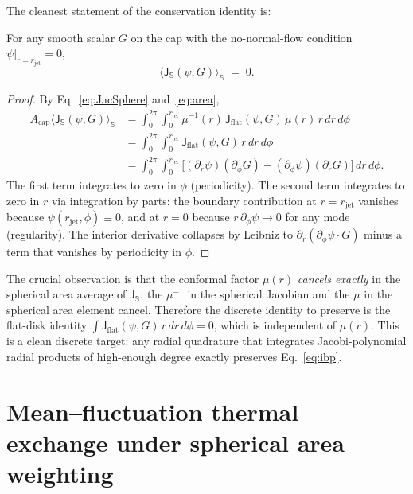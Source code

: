\documentclass[11pt]{article}
\newcommand{\Jflat}{\mathsf{J}_{\mathrm{flat}}}
\newcommand{\Jsphere}{\mathsf{J}_{\mathbb{S}}}
\newcommand{\meanS}[1]{\langle #1 \rangle_{\mathbb{S}}}
\newcommand{\rjet}{r_{\mathrm{jet}}}
\begin{document}
The cleanest statement of the conservation identity is:
\begin{lemma}
For any smooth scalar $G$ on the cap with the no-normal-flow
condition $\psi|_{r=\rjet} = 0$,
\begin{equation}
  \meanS{\Jsphere(\psi, G)} \;=\; 0.
  \label{eq:ibp}
\end{equation}
\end{lemma}
\begin{proof}
By Eq.~\eqref{eq:JacSphere} and~\eqref{eq:area},
\begin{align*}
  A_{\mathrm{cap}}\meanS{\Jsphere(\psi, G)}
  &= \int_{0}^{2\pi}\!\!\int_{0}^{\rjet}
  \mu^{-1}(r)\,\Jflat(\psi, G)\,\mu(r)\,r\,dr\,d\phi \\
  &= \int_{0}^{2\pi}\!\!\int_{0}^{\rjet}
  \Jflat(\psi, G)\,r\,dr\,d\phi \\
  &= \int_{0}^{2\pi}\!\!\int_{0}^{\rjet}
  \bigl[(\partial_{r}\psi)(\partial_{\phi}G)
  - (\partial_{\phi}\psi)(\partial_{r}G)\bigr]\,dr\,d\phi.
\end{align*}
The first term integrates to zero in $\phi$ (periodicity).  The
second term integrates to zero in $r$ via integration by parts: the
boundary contribution at $r=\rjet$ vanishes because $\psi(\rjet, \phi)
\equiv 0$, and at $r=0$ because $r\,\partial_{\phi}\psi \to 0$ for any
mode (regularity).  The interior derivative collapses by Leibniz to
$\partial_{r}(\partial_{\phi}\psi\cdot G)$ minus a term that
vanishes by periodicity in $\phi$.
\end{proof}

The crucial observation is that the conformal factor $\mu(r)$
\emph{cancels exactly} in the spherical area average of $\Jsphere$:
the $\mu^{-1}$ in the spherical Jacobian and the $\mu$ in the
spherical area element cancel.  Therefore the discrete identity to
preserve is the flat-disk identity $\int \Jflat(\psi, G)\,r\,dr\,d\phi
= 0$, which is independent of $\mu(r)$.  This is a clean discrete
target: any radial quadrature that integrates Jacobi-polynomial radial
products of high-enough degree exactly preserves Eq.~\eqref{eq:ibp}.

\section{Mean--fluctuation thermal exchange under spherical area
weighting}
\label{sec:sbp}
\end{document}
